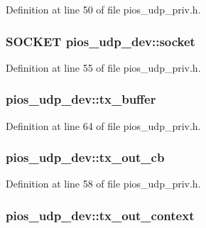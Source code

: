 Definition at line 50 of file pios\-\_\-udp\-\_\-priv.\-h.

\hypertarget{structpios__udp__dev_a68ba5864c4b71945feb362da0d3e02a1}{
\subsubsection[{socket}]{\setlength{\rightskip}{0pt plus 5cm}S\-O\-C\-K\-E\-T pios\-\_\-udp\-\_\-dev\-::socket}}\label{structpios__udp__dev_a68ba5864c4b71945feb362da0d3e02a1}


Definition at line 55 of file pios\-\_\-udp\-\_\-priv.\-h.

\hypertarget{structpios__udp__dev_ad712d626bc4160554ceb0765723d6069}{
\subsubsection[{tx\-\_\-buffer}]{ pios\-\_\-udp\-\_\-dev\-::tx\-\_\-buffer}}\label{structpios__udp__dev_ad712d626bc4160554ceb0765723d6069}


Definition at line 64 of file pios\-\_\-udp\-\_\-priv.\-h.

\hypertarget{structpios__udp__dev_a72acdfb1fbde453ec2ba74b7057c065a}{
\subsubsection[{tx\-\_\-out\-\_\-cb}]{ pios\-\_\-udp\-\_\-dev\-::tx\-\_\-out\-\_\-cb}}\label{structpios__udp__dev_a72acdfb1fbde453ec2ba74b7057c065a}


Definition at line 58 of file pios\-\_\-udp\-\_\-priv.\-h.

\hypertarget{structpios__udp__dev_aa9d5eb1eef4914bc11ba97d5e425184b}{
\subsubsection[{tx\-\_\-out\-\_\-context}]{ pios\-\_\-udp\-\_\-dev\-::tx\-\_\-out\-\_\-context}}\label{structpios__udp__dev_aa9d5eb1eef4914bc11ba97d5e425184b}



